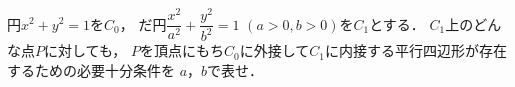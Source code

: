 \documentclass[../../main.tex]{subfiles}
\begin{document}
円$x^2+y^2=1$を$C_0$，
だ円$\displaystyle \dfrac{x^2}{a^2}+\dfrac{y^2}{b^2}=1$ $(a>0,b>0)$を$C_1$とする．
$C_1$上のどんな点$P$に対しても，
$P$を頂点にもち$C_0$に外接して$C_1$に内接する平行四辺形が存在するための必要十分条件を
$a$，$b$で表せ．
\end{document}
